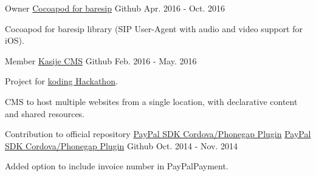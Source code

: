 \begin{cventries}
  \cventry
    {Owner} %
    {\faMobile \hphantom{-} \href{https://github.com/zp1ke/taresip}{Cocoapod for baresip}} %
    {\faGithubSquare\acvHeaderIconSep Github} %
    {Apr. 2016 - Oct. 2016} %
    {
      \begin{cvitems} %
        \item {Cocoapod for baresip library (SIP User-Agent with audio and video support for iOS).}
      \end{cvitems}
    }

  \cventry
    {Member} %
    {\href{https://github.com/touwolf/kasije}{Kasije CMS}} %
    {\faGithubSquare\acvHeaderIconSep Github} %
    {Feb. 2016 - May. 2016} %
    {
      \begin{cvitems} %
        \item {Project for \href{https://www.koding.com/Hackathon}{koding Hackathon}.}
        \item {CMS to host multiple websites from a single location, with declarative content and shared resources.}
      \end{cvitems}
    }

  \cventry
    {Contribution to official repository \href{https://github.com/paypal/PayPal-Cordova-Plugin}{PayPal SDK Cordova/Phonegap Plugin}} %
    {\faPaypal \hphantom{-} \href{https://github.com/zp1ke/PayPal-Cordova-Plugin}{PayPal SDK Cordova/Phonegap Plugin}} %
    {\faGithubSquare\acvHeaderIconSep Github} %
    {Oct. 2014 - Nov. 2014} %
    {
      \begin{cvitems} %
        \item {Added option to include invoice number in PayPalPayment.}
      \end{cvitems}
    }

\end{cventries}
